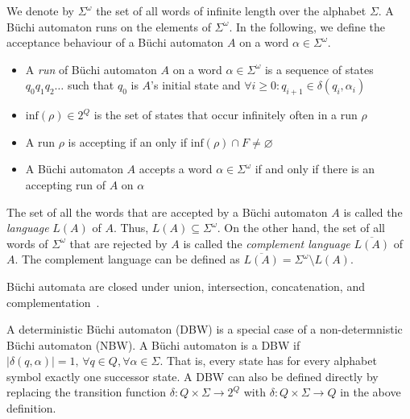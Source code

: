\documentclass[a4paper]{report}
\newcommand{\om}{{$\omega$}}
\begin{document}
We denote by $\Sigma^\omega$ the set of all words of infinite length over the alphabet $\Sigma$. A Büchi automaton runs on the elements of $\Sigma^\omega$. In the following, we define the acceptance behaviour of a Büchi automaton $A$ on a word $\alpha \in \Sigma^\omega$.



\begin{itemize}
\item A \emph{run} of Büchi automaton $A$ on a word $\alpha \in \Sigma^\omega$ is a sequence of states $q_0q_1q_2\dots$ such that $q_0$ is $A$'s initial state and $\forall i \geq 0: q_{i+1} \in \delta(q_i, \alpha_i)$
\item $\textrm{inf}(\rho) \in 2^Q$ is the set of states that occur infinitely often in a run $\rho$
\item A run $\rho$ is accepting if an only if $\textrm{inf}(\rho) \cap F \neq \varnothing$
\item A Büchi automaton $A$ accepts a word $\alpha \in \Sigma^\omega$ if and only if there is an accepting run of $A$ on $\alpha$
\end{itemize}

The set of all the words that are accepted by a Büchi automaton $A$ is called the \emph{language} $L(A)$ of $A$. Thus, $L(A) \subseteq \Sigma^\omega$. On the other hand, the set of all words of $\Sigma^\omega$ that are rejected by $A$ is called the \emph{complement language} $\overline{L(A)}$ of $A$. The complement language can be defined as $\overline{L(A)} = \Sigma^\omega \setminus L(A)$.

Büchi automata are closed under union, intersection, concatenation, and complementation~\cite{1996_vardi}.

A deterministic Büchi automaton (DBW) is a special case of a non-determnistic Büchi automaton (NBW). A Büchi automaton is a DBW if $|\delta(q,\alpha)| = 1, \, \forall q \in Q, \forall \alpha \in \Sigma $. That is, every state has for every alphabet symbol exactly one successor state. A DBW can also be defined directly by replacing the transition function $\delta: Q \times \Sigma \rightarrow 2^Q$ with $\delta: Q \times \Sigma \rightarrow Q$ in the above definition.
\end{document}
